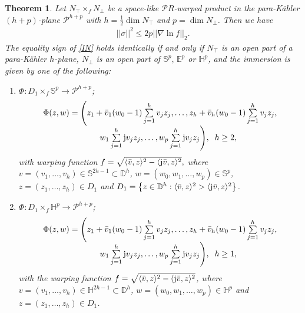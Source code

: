\documentclass{amsart}
\theoremstyle{plain}
\newtheorem{theorem}{Theorem}[section]
\numberwithin{equation}{section}
\theoremstyle{remark}
\numberwithin{equation}{section}
\begin{document}
\begin{theorem} \label{T:15.2}
Let ${{N_\top}}\times_f{N_\perp}$ be a space-like ${{\mathcal{P}}} R$-warped product  in the  para-K\"ahler $(h+p)$-plane ${{\mathcal{P}}}^{h+p}$ with $h=\frac{1}{2}\dim {{N_\top}}$ and $p=\dim {N_\perp}$. Then we have 
\begin{align}\label{IN} ||\sigma||^{2}\leq 2p{||\nabla\ln f||}_2.\end{align} 
The equality sign of \eqref{IN} holds identically if and only if  ${{N_\top}}$ is an open part of a para-K\"ahler $h$-plane, ${N_\perp}$ is an open part of $\mathbb S^{p},\, \mathbb E^{p}$ or $\mathbb H^{p}$,  and the immersion  is given by one of the following:

\begin{enumerate}
\item $\Phi:D_{1}\times_f {\mathbb{S}}^p\longrightarrow {{\mathcal{P}}}^{h+p}$;
\begin{equation}
\label{case1}
\begin{array}{c}
\Phi(z,w)=\text{\small$\Bigg($}z_1+\bar v_1(w_0-1)\sum\limits_{j=1}^hv_jz_j,\ldots,z_h+\bar v_h(w_0-1)\sum\limits_{j=1}^hv_jz_j,\\ \qquad w_1\sum\limits_{j=1}^h{\rm j} v_jz_j,\ldots,w_p\sum\limits_{j=1}^h{{\rm j}} v_jz_j \text{\small$\Bigg)$},\;\; h\geq 2,
\end{array}
\end{equation}
with warping function $f=\sqrt{\langle \bar v,z\rangle^2-\langle {{\rm j}} \bar v,z\rangle^2},$
where $v=(v_1,\ldots,v_h)\in{\mathbb{S}}^{2h-1}\subset {\mathbb{D}}^h$, $ w=(w_0,w_1,\ldots,w_p)\in{\mathbb{S}}^p$, $ z=(z_1,\ldots,z_h)\in D_{1}$ 
and $D_{1}=\left\{z\in{\mathbb{D}}^h : \langle \bar v,z\rangle^2>\langle {{\rm j}} \bar v,z\rangle^2\right\}$.

\item $\Phi:D_{1}\times_f {\mathbb{H}}^p\longrightarrow {{\mathcal{P}}}^{h+p}$;
\begin{equation}
\label{case2}
\begin{array}{c}
\Phi(z,w)=\text{\small$\Bigg($}z_1+\bar v_1(w_0-1)\sum\limits_{j=1}^hv_jz_j,\ldots,z_h+\bar v_h(w_0-1)\sum\limits_{j=1}^hv_jz_j,\\
\qquad w_1\sum\limits_{j=1}^h{{\rm j}} v_jz_j,\ldots,w_p\sum\limits_{j=1}^h{{\rm j}} v_jz_j \text{\small$\Bigg)$},\;\; h\geq 1,
\end{array}
\end{equation}
with the warping function $f=\sqrt{\langle \bar v,z\rangle^2-\langle {{\rm j}} \bar v,z\rangle^2}$, where $v=(v_1,\ldots,v_h)\in{\mathbb{H}}^{2h-1}\subset {\mathbb{D}}^h$,
$w=(w_0,w_1,\ldots,w_p)\in{\mathbb{H}}^p$  and 
$z=(z_1,\ldots,z_h)\in D_{1}$.


\end{enumerate}
\end{theorem}
\end{document}
